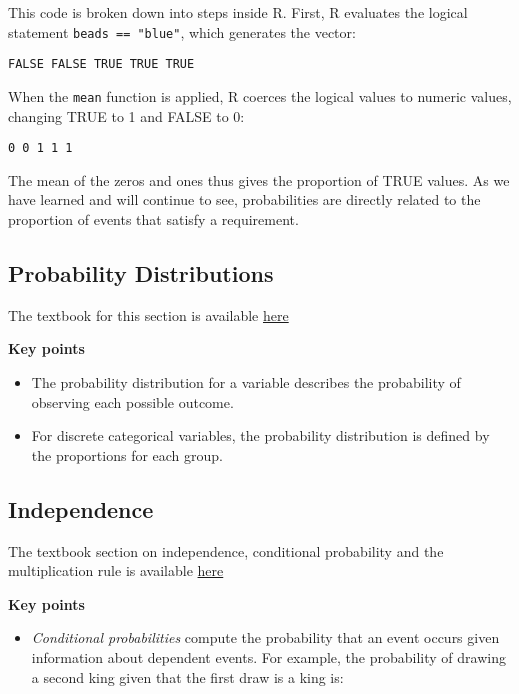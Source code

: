\documentclass[
]{article}
\providecommand{\tightlist}{%
  \setlength{\itemsep}{0pt}\setlength{\parskip}{0pt}}
\begin{document}
This code is broken down into steps inside R. First, R evaluates the
logical statement \texttt{beads\ ==\ "blue"}, which generates the
vector:

\texttt{FALSE\ FALSE\ TRUE\ TRUE\ TRUE}

When the \texttt{mean} function is applied, R coerces the logical values
to numeric values, changing TRUE to 1 and FALSE to 0:

\texttt{0\ 0\ 1\ 1\ 1}

The mean of the zeros and ones thus gives the proportion of TRUE values.
As we have learned and will continue to see, probabilities are directly
related to the proportion of events that satisfy a requirement.

\hypertarget{probability-distributions}{%
\subsection{Probability Distributions}\label{probability-distributions}}

The textbook for this section is available
\href{https://rafalab.github.io/dsbook/probability.html\#discrete-probability-distributions}{here}

\textbf{Key points}

\begin{itemize}
\tightlist
\item
  The probability distribution for a variable describes the probability
  of observing each possible outcome.
\item
  For discrete categorical variables, the probability distribution is
  defined by the proportions for each group.
\end{itemize}

\hypertarget{independence}{%
\subsection{Independence}\label{independence}}

The textbook section on independence, conditional probability and the
multiplication rule is available
\href{https://rafalab.github.io/dsbook/probability.html\#independence}{here}

\textbf{Key points}

\begin{itemize}
\tightlist
\item
  \emph{Conditional probabilities} compute the probability that an event
  occurs given information about dependent events. For example, the
  probability of drawing a second king given that the first draw is a
  king is:
\end{itemize}
\end{document}
